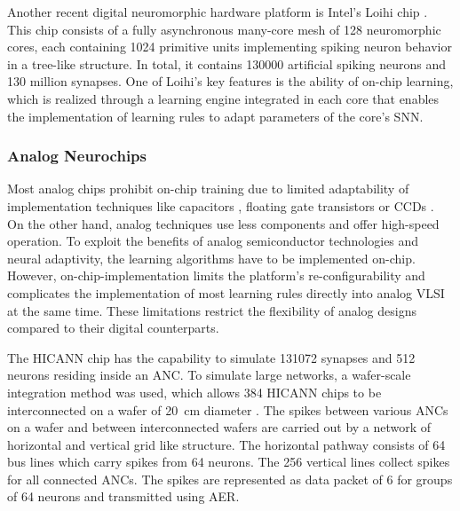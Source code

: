 Another recent digital neuromorphic hardware platform is Intel's Loihi chip \parencite{Davies2018}.
This chip consists of a fully asynchronous many-core mesh of \num{128} neuromorphic cores, each containing \num{1024} primitive units implementing spiking neuron behavior in a tree-like structure.
In total, it contains \num{130000} artificial spiking neurons and \num{130} million synapses.
One of Loihi's key features is the ability of on-chip learning, which is realized through a learning engine integrated in each core that enables the implementation of learning rules to adapt parameters of the core's \ac{SNN}.

\subsubsection{Analog Neurochips}

Most analog chips prohibit on-chip training due to limited adaptability of implementation techniques like capacitors \parencite{Schwartz1990}, floating gate transistors \parencite{Holler1989} or \acp{CCD} \parencite{Agranat1990}.
On the other hand, analog techniques use less components and offer high-speed operation.
To exploit the benefits of analog semiconductor technologies and neural adaptivity, the learning algorithms have to be implemented on-chip.
However, on-chip-implementation limits the platform's re-configurability and complicates the implementation of most learning rules directly into analog \ac{VLSI} at the same time.
These limitations restrict the flexibility of analog designs compared to their digital counterparts.

The \ac{HICANN} chip \parencite{Schemmel2008} has the capability to simulate \num{131072} synapses and \num{512} neurons residing inside an \ac{ANC}.
To simulate large networks, a wafer-scale integration method was used, which allows \num{384} \ac{HICANN} chips to be interconnected on a wafer of \SI{20}{\centi\meter} diameter \parencite{Schemmel2010}.
The spikes between various \acp{ANC} on a wafer and between interconnected wafers are carried out by a network of horizontal and vertical grid like structure.
The horizontal pathway consists of \num{64} bus lines which carry spikes from \num{64} neurons.
The \num{256} vertical lines collect spikes for all connected \acp{ANC}.
The spikes are represented as data packet of \SI{6}{\bit} for groups of \num{64} neurons and transmitted using \ac{AER}. 

